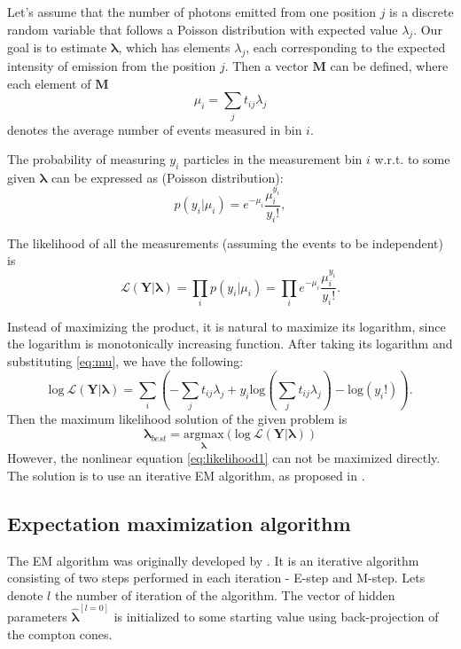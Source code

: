 Let's assume that the number of photons emitted from one position $j$ is a discrete random variable that follows a Poisson distribution with expected value $\lambda_{j}$.
Our goal is to estimate $\mathbf{\lambda}$, which has elements $\lambda_{j}$, each corresponding to the expected intensity of emission from the position $j$.
Then a vector $\mathbf{M}$ can be defined, where each element of $\mathbf{M}$ 
\begin{equation}
  \mu_{i} = \sum_{j} t_{ij}\lambda_{j}
  \label{eq:mu}
\end{equation}
denotes the average number of events measured in bin $i$.

The probability of measuring $y_{i}$ particles in the measurement bin $i$ w.r.t. to some given $\mathbf{\lambda}$ can be expressed as (Poisson distribution):
\begin{equation}
  p(y_{i} |\mu_{i} ) = e^{-\mu_{i}} \frac{\mu_{i}^{y_i}}{y_{i}!},
\end{equation}

The likelihood of all the measurements (assuming the events to be independent) is
\begin{equation}  
  \mathcal{L}(\mathbf{Y} | \mathbf{\lambda}) = \prod_{i}p(y_{i} |\mu_{i} ) = \prod_{i} e^{-\mu_{i}} \frac{\mu_{i}^{y_i}}{y_{i}!}.
\end{equation}

Instead of maximizing the product, it is natural to maximize its logarithm, since the logarithm is monotonically increasing function.
After taking its logarithm and substituting \ref{eq:mu}, we have the following:
\begin{equation}  
  \mathrm{log}\ \mathcal{L}(\mathbf{Y} | \mathbf{\lambda}) = \sum_{i}\left ( -\sum_{j} t_{ij}\lambda_{j} + y_{i} \mathrm{log}(\sum_{j} t_{ij}\lambda_{j})  - \mathrm{log}(y_{i}!) \right ).
  \label{eq:likelihood1}
\end{equation}
Then the maximum likelihood solution of the given problem is
\begin{equation}
  \mathbf{\lambda}_{best} = \underset{\mathbf{\lambda}}{\mathrm{argmax}}( \mathrm{log}\ \mathcal{L}(\mathbf{Y} | \mathbf{\lambda}))
\end{equation}
However, the nonlinear equation \ref{eq:likelihood1} can not be maximized directly.
The solution is to use an iterative \ac{EM} algorithm, as proposed in \cite{MLEM_Lange_Carlson_1984}.
\subsection{Expectation maximization algorithm}
The \ac{EM} algorithm was originally developed by \cite{EM}. 
It is an iterative algorithm consisting of two steps performed in each iteration - E-step and M-step.
Lets denote $l$ the number of iteration of the algorithm.
The vector of hidden parameters $\mathbf{\hat{\lambda}}^{[l = 0]}$ is initialized to some starting value using back-projection of the compton cones.

